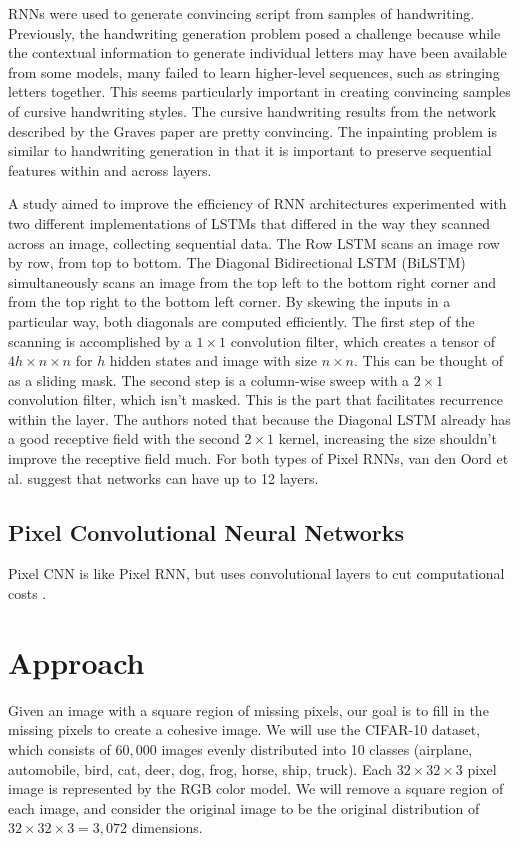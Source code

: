 \documentclass[10pt,twocolumn,letterpaper]{article}
\begin{document}
RNNs were used to generate convincing script from samples of handwriting. Previously, the handwriting generation problem posed a challenge because while the contextual information to generate individual letters may have been available from some models, many failed to learn higher-level sequences, such as stringing letters together. \cite{handwritingRNN} This seems particularly important in creating convincing samples of cursive handwriting styles. The cursive handwriting results from the network described by the Graves paper are pretty convincing. The inpainting problem is similar to handwriting generation in that it is important to preserve sequential features within and across layers.

A study aimed to improve the efficiency of RNN architectures experimented with two different implementations of LSTMs that differed in the way they scanned across an image, collecting sequential data. The Row LSTM scans an image row by row, from top to bottom. The Diagonal Bidirectional LSTM (BiLSTM) simultaneously scans an image from the top left to the bottom right corner and from the top right to the bottom left corner. By skewing the inputs in a particular way, both diagonals are computed efficiently. The first step of the scanning is accomplished by a $1 \times 1$ convolution filter, which creates a tensor of $4h \times n \times n$ for $h$ hidden states and image with size $n \times n$. This can be thought of as a sliding mask. The second step is a column-wise sweep with a $2  \times  1$ convolution filter, which isn't masked. This is the part that facilitates recurrence within the layer. The authors noted that because the Diagonal LSTM already has a good receptive field with the second $2  \times  1$ kernel, increasing the size shouldn't improve the receptive field much. For both types of Pixel RNNs, van den Oord et al. suggest that networks can have up to 12 layers.



\subsection{Pixel Convolutional Neural Networks}
Pixel CNN is like Pixel RNN, but uses convolutional layers to cut computational costs \cite{pixelCNN}.

\section{Approach}
Given an image with a square region of missing pixels, our goal is to fill in the missing pixels to create a cohesive image. We will use the CIFAR-10 dataset, which consists of $60,000$ images evenly distributed into 10 classes (airplane, automobile, bird, cat, deer, dog, frog, horse, ship, truck). Each $32 \times 32 \times 3$ pixel image is represented by the RGB color model. We will remove a square region of each image, and consider the original image to be the original distribution of $32 \times 32 \times 3 = 3,072$ dimensions. 
\end{document}
